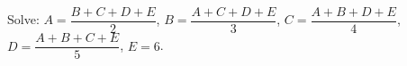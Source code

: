 Solve: $A=\dfrac{B+C+D+E}2$, $B=\dfrac{A+C+D+E}3$, $C=\dfrac{A+B+D+E}4$, $D=\dfrac{A+B+C+E}5$, $E=6$.
